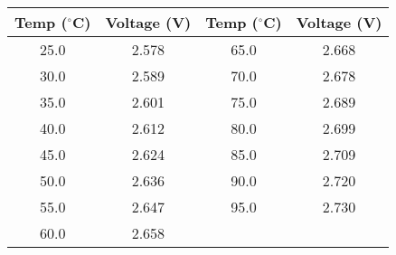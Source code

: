 \begin{tabular}{|c|c||c|c|}
    \hline
    \textbf{Temp ($^{\circ}$C)} & \textbf{Voltage (V)} & \textbf{Temp ($^{\circ}$C)} & \textbf{Voltage (V)} \\
    \hline
    25.0 & 2.578 & 65.0 & 2.668 \\
    30.0 & 2.589 & 70.0 & 2.678 \\
    35.0 & 2.601 & 75.0 & 2.689 \\
    40.0 & 2.612 & 80.0 & 2.699 \\
    45.0 & 2.624 & 85.0 & 2.709 \\
    50.0 & 2.636 & 90.0 & 2.720 \\
    55.0 & 2.647 & 95.0 & 2.730 \\
    60.0 & 2.658 & & \\
    \hline
\end{tabular}